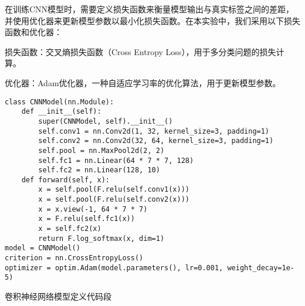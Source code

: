 在训练CNN模型时，需要定义损失函数来衡量模型输出与真实标签之间的差距，并使用优化器来更新模型参数以最小化损失函数。在本实验中，我们采用以下损失函数和优化器：

损失函数：交叉熵损失函数（Cross Entropy Loss），用于多分类问题的损失计算。

优化器：Adam优化器，一种自适应学习率的优化算法，用于更新模型参数。

\begin{listing}[htbp]
  \begin{verbatim}
class CNNModel(nn.Module):
    def __init__(self):
        super(CNNModel, self).__init__()
        self.conv1 = nn.Conv2d(1, 32, kernel_size=3, padding=1)
        self.conv2 = nn.Conv2d(32, 64, kernel_size=3, padding=1)
        self.pool = nn.MaxPool2d(2, 2)
        self.fc1 = nn.Linear(64 * 7 * 7, 128)
        self.fc2 = nn.Linear(128, 10)
    def forward(self, x):
        x = self.pool(F.relu(self.conv1(x)))
        x = self.pool(F.relu(self.conv2(x)))
        x = x.view(-1, 64 * 7 * 7)
        x = F.relu(self.fc1(x))
        x = self.fc2(x)
        return F.log_softmax(x, dim=1)
model = CNNModel()
criterion = nn.CrossEntropyLoss()
optimizer = optim.Adam(model.parameters(), lr=0.001, weight_decay=1e-5)
  \end{verbatim}
  \caption{卷积神经网络模型定义代码段}
\end{listing}